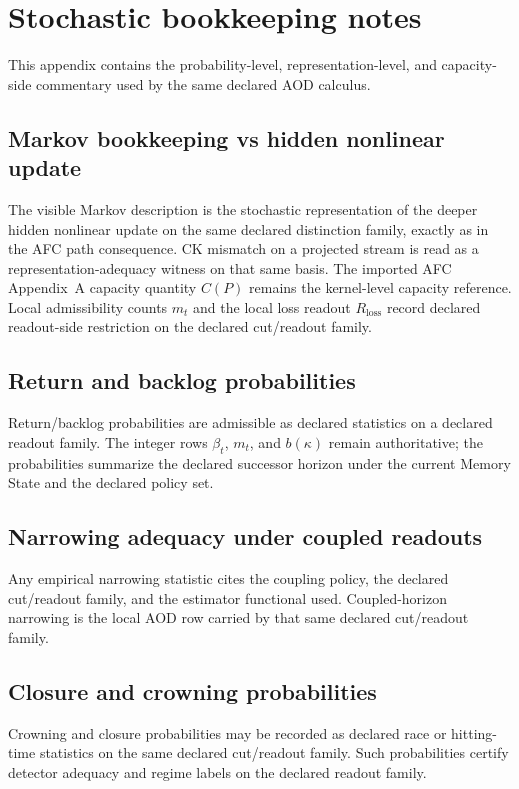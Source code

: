 \section{Stochastic bookkeeping notes}

This appendix contains the probability-level, representation-level, and capacity-side commentary used by the same declared AOD calculus.

\subsection{Markov bookkeeping vs hidden nonlinear update}
The visible Markov description is the stochastic representation of the deeper hidden nonlinear update on the same declared distinction family, exactly as in the AFC path consequence. CK mismatch on a projected stream is read as a representation-adequacy witness on that same basis. The imported AFC Appendix~A capacity quantity $C(P)$ remains the kernel-level capacity reference. Local admissibility counts $m_t$ and the local loss readout $R_{\mathrm{loss}}$ record declared readout-side restriction on the declared cut/readout family.

\subsection{Return and backlog probabilities}
Return/backlog probabilities are admissible as declared statistics on a declared readout family. The integer rows $\beta_t$, $m_t$, and $b(\kappa)$ remain authoritative; the probabilities summarize the declared successor horizon under the current Memory State and the declared policy set.

\subsection{Narrowing adequacy under coupled readouts}
Any empirical narrowing statistic cites the coupling policy, the declared cut/readout family, and the estimator functional used. Coupled-horizon narrowing is the local AOD row carried by that same declared cut/readout family.

\subsection{Closure and crowning probabilities}
Crowning and closure probabilities may be recorded as declared race or hitting-time statistics on the same declared cut/readout family. Such probabilities certify detector adequacy and regime labels on the declared readout family.

